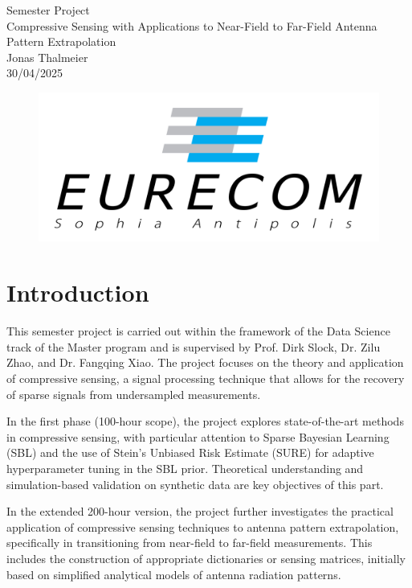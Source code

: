 \documentclass{article}
\begin{document}
\begin{titlepage}
\begin{center}
    \vspace{15cm}
    \huge{Semester Project}\\
    \vspace{2cm}
    \Huge{Compressive Sensing with Applications to Near-Field to Far-Field Antenna Pattern
Extrapolation}\\
    \vspace{2cm}
    \Large{Jonas Thalmeier}\\
    \vspace{1cm}
    30/04/2025
\end{center}
\vspace{3cm}
\begin{figure}[h]
    \centering
    \includegraphics[width=.5\textwidth]{Figures/Eurecom.png}
\end{figure}
\end{titlepage}

\newpage
\tableofcontents
\thispagestyle{empty}
\newpage
\setcounter{page}{1}

\section{Introduction}
This semester project is carried out within the framework of the Data Science track of the Master program and is supervised by Prof. Dirk Slock, Dr. Zilu Zhao, and Dr. Fangqing Xiao. The project focuses on the theory and application of compressive sensing, a signal processing technique that allows for the recovery of sparse signals from undersampled measurements.

In the first phase (100-hour scope), the project explores state-of-the-art methods in compressive sensing, with particular attention to Sparse Bayesian Learning (SBL) and the use of Stein’s Unbiased Risk Estimate (SURE) for adaptive hyperparameter tuning in the SBL prior. Theoretical understanding and simulation-based validation on synthetic data are key objectives of this part.

In the extended 200-hour version, the project further investigates the practical application of compressive sensing techniques to antenna pattern extrapolation, specifically in transitioning from near-field to far-field measurements. This includes the construction of appropriate dictionaries or sensing matrices, initially based on simplified analytical models of antenna radiation patterns.
\end{document}
